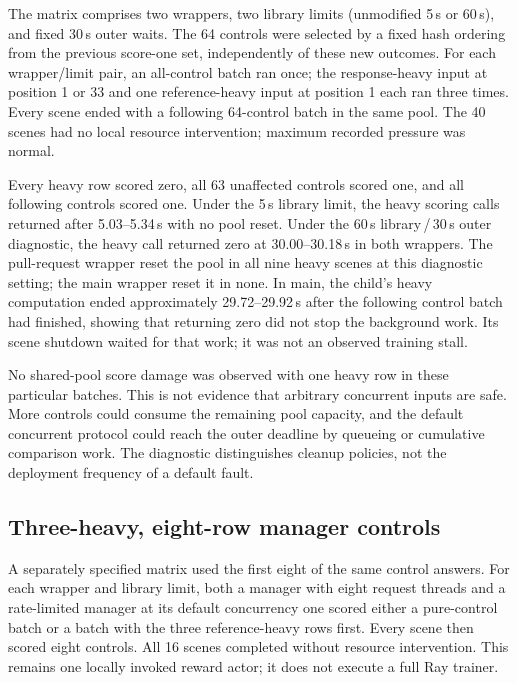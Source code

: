 \documentclass[11pt,a4paper]{article}
\begin{document}
The matrix comprises two wrappers, two library limits (unmodified 5\,s or 60\,s), and fixed 30\,s outer waits. The 64 controls were selected by a fixed hash ordering from the previous score-one set, independently of these new outcomes. For each wrapper/limit pair, an all-control batch ran once; the response-heavy input at position 1 or 33 and one reference-heavy input at position 1 each ran three times. Every scene ended with a following 64-control batch in the same pool. The 40 scenes had no local resource intervention; maximum recorded pressure was normal.

Every heavy row scored zero, all 63 unaffected controls scored one, and all following controls scored one. Under the 5\,s library limit, the heavy scoring calls returned after 5.03--5.34\,s with no pool reset. Under the 60\,s library\,/\,30\,s outer diagnostic, the heavy call returned zero at 30.00--30.18\,s in both wrappers. The pull-request wrapper reset the pool in all nine heavy scenes at this diagnostic setting; the main wrapper reset it in none. In main, the child's heavy computation ended approximately 29.72--29.92\,s after the following control batch had finished, showing that returning zero did not stop the background work. Its scene shutdown waited for that work; it was not an observed training stall.

No shared-pool score damage was observed with one heavy row in these particular batches. This is not evidence that arbitrary concurrent inputs are safe. More controls could consume the remaining pool capacity, and the default concurrent protocol could reach the outer deadline by queueing or cumulative comparison work. The diagnostic distinguishes cleanup policies, not the deployment frequency of a default fault.

\subsection{Three-heavy, eight-row manager controls}
A separately specified matrix used the first eight of the same control answers. For each wrapper and library limit, both a  manager with eight request threads and a rate-limited manager at its default concurrency one scored either a pure-control batch or a batch with the three reference-heavy rows first. Every scene then scored eight controls. All 16 scenes completed without resource intervention. This remains one locally invoked reward actor; it does not execute a full Ray trainer.
\end{document}
